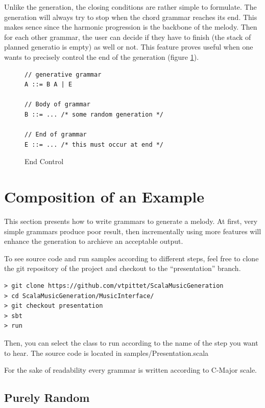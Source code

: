 \documentclass[twocolumn, 11pt]{article}
\begin{document}

Unlike the generation, the closing conditions are rather simple to formulate. The generation will always try to stop when the chord grammar reaches its end. This makes sence since the harmonic progression is the backbone of the melody. Then for each other grammar, the user can decide if they have to finish (the stack of planned generatio is empty) as well or not. This feature proves useful when one wants to precisely control the end of the generation (figure \ref{fig:endCTRL}).


\begin{figure}[h]
  \centering
  \begin{lstlisting}
// generative grammar
A ::= B A | E

// Body of grammar
B ::= ... /* some random generation */

// End of grammar
E ::= ... /* this must occur at end */
  \end{lstlisting}
  \caption{End Control}
  \label{fig:endCTRL}
\end{figure}


\section{Composition of an Example}

This section presents how to write grammars to generate a melody. At first, very simple grammars produce poor result, then incrementally using more features will enhance the generation to archieve an acceptable output.

To see source code and run samples according to different steps, feel free to clone the git repository of the project and checkout to the ``presentation'' branch.


\begin{lstlisting}
> git clone https://github.com/vtpittet/ScalaMusicGeneration
> cd ScalaMusicGeneration/MusicInterface/
> git checkout presentation
> sbt
> run
\end{lstlisting}


Then, you can select the class to run according to the name of the step you want to hear.
The source code is located in samples/Presentation.scala

For the sake of readability every grammar is written according to C-Major scale.
\subsection{Purely Random}
\end{document}
